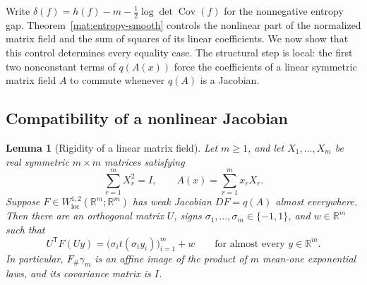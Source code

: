 \documentclass[11pt]{article}
\newcommand{\R}{\mathbb R}
\newcommand{\Dgap}{\delta}
\DeclareMathOperator{\Cov}{Cov}
\newtheorem{lemma}[theorem]{Lemma}
\theoremstyle{definition}
\theoremstyle{remark}
\numberwithin{equation}{section}
\begin{document}
Write $\Dgap(f)=h(f)-m-\tfrac12\log\det\Cov(f)$ for the
nonnegative entropy gap.  Theorem~\ref{mat:entropy-smooth} controls the nonlinear part of the normalized
matrix field and the sum of squares of its linear coefficients.  We now
show that this control determines every equality case.  The structural
step is local: the first two nonconstant terms of $q(A(x))$ force the
coefficients of a linear symmetric matrix field $A$ to commute whenever
$q(A)$ is a Jacobian.

\subsection{Compatibility of a nonlinear Jacobian}

\begin{lemma}[Rigidity of a linear matrix field]\label{lem:linear-jacobian}
Let $m\ge1$, and let $X_1,\ldots,X_m$ be real symmetric $m\times m$ matrices satisfying
\[
  \sum_{r=1}^m X_r^2=I,
  \qquad A(x)=\sum_{r=1}^m x_rX_r.
\]
Suppose $F\in W^{1,2}_{\mathrm{loc}}(\R^m;\R^m)$ has weak Jacobian
$DF=q(A)$ almost everywhere.  Then there are an orthogonal matrix $U$,
signs $\sigma_1,\ldots,\sigma_m\in\{-1,1\}$, and $w\in\R^m$ such that
\begin{equation}\label{eq:rigid-map}
  U^{\mathsf T}F(Uy)
  =\bigl(\sigma_i t(\sigma_i y_i)\bigr)_{i=1}^m+w
  \qquad\text{for almost every }y\in\R^m.
\end{equation}
In particular, $F_\#\gamma_m$ is an affine image of the product of $m$
mean-one exponential laws, and its covariance matrix is $I$.
\end{lemma}
\end{document}

